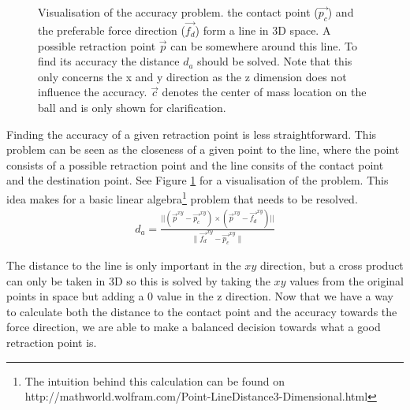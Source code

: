 \documentclass[a4paper]{article}
\begin{document}
\begin{figure}
  \resizebox{\textwidth}{!} {
    }
    \caption{Visualisation of the accuracy problem. \small{the contact point
            ($\vec{p_c}$) and the preferable force direction ($\vec{f_d}$) form a line
    in 3D space. A possible retraction point $\vec{p}$ can be somewhere around
    this line. To find its accuracy the distance $d_a$ should be solved. Note that
    this only concerns the x and y direction as the z dimension does not
    influence the accuracy. $\vec{c}$ denotes the center of mass
    location on the ball and is only shown for clarification.}}
    \label{fig:accuracy}
\end{figure}    

Finding the accuracy of a given retraction point is less straightforward. This
problem can be seen as the closeness of a given point to the line, where the
point consists of a possible retraction point and the line consits of the
contact point and the destination point. See Figure \ref{fig:accuracy} for a
visualisation of the problem. This idea makes for a basic linear algebra\footnote{The intuition behind this calculation can be found on http://mathworld.wolfram.com/Point-LineDistance3-Dimensional.html }
problem that needs to be resolved.
\begin{align*}
    d_a = \frac{||(\vec{p}^{xy} -\vec{p_c}^{xy}) \times (\vec{p}^{xy} -
    \vec{f_d}^{xy})||}{\|\vec{f_d}^{xy}- \vec{p_c}^{xy}\|}
\end{align*}

The distance to the line is only important in the $xy$ direction, but a cross
product can only be taken in 3D so this is solved by taking the $xy$
values from the original points in space but adding a 0 value in the z
direction.
Now that we have a way to calculate both the distance to the contact point and
the accuracy towards the force direction, we are able to make a balanced
decision towards what a good retraction point is.
\end{document}
